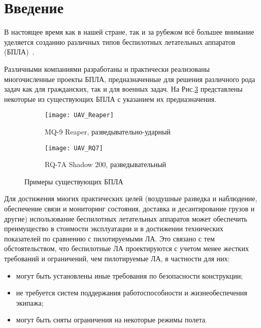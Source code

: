 \chapter*{Введение}

В настоящее время как в нашей стране, так и за рубежом всё большее внимание уделяется созданию различных типов беспилотных летательных аппаратов (БПЛА)~\cite{UAVBook}. 


Различными компаниями разработаны и практически реализованы многочисленные проекты БПЛА, предназначенные для решения различного рода задач как для гражданских, так и для военных задач. На Рис.\ref{fig:UAVs} представлены некоторые из существующих БПЛА с указанием их предназначения.


\begin{figure}[H]
        \begin{subfigure}[b]{0.47\textwidth}
                \texttt{[image: UAV\_Reaper]}
                \caption{MQ-9 Reaper, разведывательно-ударный} %
                \label{fig:UAV_Reaper}
        \end{subfigure}%
        \hspace{\fill}
        \begin{subfigure}[b]{0.47\textwidth}
                \texttt{[image: UAV\_RQ7]}
                \caption{RQ-7A Shadow 200, разведывательный}
                \label{fig:UAV_RQ7}
        \end{subfigure}
        \caption{Примеры существующих БПЛА}\label{fig:UAVs}
\end{figure}

Для достижения многих практических целей (воздушные разведка и наблюдение, обеспечение связи и мониторинг состояния, доставка и десантирование грузов и другие) использование беспилотных летательных аппаратов может обеспечить преимущество в стоимости эксплуатации и в достижении технических показателей по сравнению с пилотируемыми ЛА. Это связано с тем обстоятельством, что беспилотные ЛА проектируются с учетом менее жестких требований и ограничений, чем пилотируемые ЛА, в частности для них:

\begin{itemize}
\item могут быть установлены иные требования по безопасности конструкции;
\item не требуется систем поддержания работоспособности и жизнеобеспечения экипажа;
\item могут быть сняты ограничения на некоторые режимы полета.
\end{itemize} 

